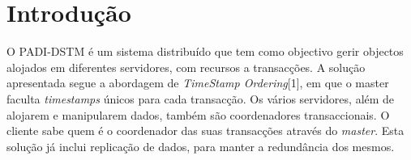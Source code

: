 \section{Introdução}

O PADI-DSTM é um sistema distribuído que tem como objectivo gerir objectos alojados em diferentes servidores, com recursos a transacções. A solução apresentada segue a abordagem de \textit{TimeStamp Ordering}[1], em que o master faculta \textit{timestamps} únicos para cada transacção. Os vários servidores, além de alojarem e manipularem dados, também são coordenadores transaccionais. O cliente sabe quem é o coordenador das suas transacções através do \textit{master}. Esta solução já inclui replicação de dados, para manter a redundância dos mesmos.